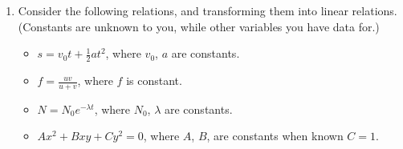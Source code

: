 \documentclass{article}
\begin{document}
\begin{enumerate}
\begin{itemize}
       \end{itemize}
\item Consider the following relations, and transforming them into linear relations. (Constants are unknown to you, while other variables you have data for.)
       \begin{itemize}
              \item[(a)] $s=v_0t+\frac 12 at^2$, where $v_0$, $a$ are constants.
              \item[(b)] $f=\frac{uv}{u+v}$, where $f$ is constant.
              \item[(c)] $N=N_0e^{-\lambda t}$, where $N_0$, $\lambda$ are constants.
              \item[(d)] $Ax^2+Bxy+Cy^2=0$, where $A$, $B$, are constants when known $C=1$.
       \end{itemize}
\end{enumerate}
\end{document}
